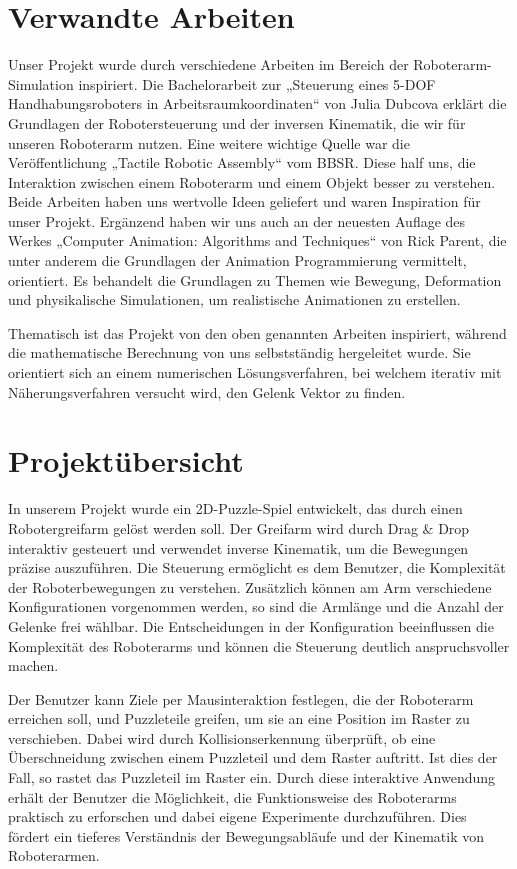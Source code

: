 \documentclass[12pt]{article}
\begin{document}
    \section{Verwandte Arbeiten}
    Unser Projekt wurde durch verschiedene Arbeiten im Bereich der Roboterarm-Simulation inspiriert. Die Bachelorarbeit
    zur „Steuerung eines 5-DOF Handhabungsroboters in Arbeitsraumkoordinaten“\cite{Far01} von Julia Dubcova erklärt die
    Grundlagen der Robotersteuerung und der inversen Kinematik, die wir für unseren Roboterarm nutzen. Eine weitere
    wichtige Quelle war die Veröffentlichung „Tactile Robotic Assembly“\cite{Far02} vom BBSR. Diese half uns, die
    Interaktion zwischen einem Roboterarm und einem Objekt besser zu verstehen. Beide Arbeiten haben uns wertvolle
    Ideen geliefert und waren Inspiration für unser Projekt. Ergänzend haben wir uns auch an der neuesten Auflage des
    Werkes „Computer Animation: Algorithms and Techniques“\cite{Far03} von Rick Parent, die unter anderem die
    Grundlagen der Animation Programmierung vermittelt, orientiert. Es behandelt die Grundlagen zu Themen wie Bewegung,
    Deformation und physikalische Simulationen, um realistische Animationen zu erstellen.

    Thematisch ist das Projekt von den oben genannten Arbeiten inspiriert, während die mathematische Berechnung
    von uns selbstständig hergeleitet wurde. Sie orientiert sich an einem numerischen Lösungsverfahren, bei welchem
    iterativ mit Näherungsverfahren versucht wird, den Gelenk Vektor zu finden.


    \section{Projektübersicht}
    In unserem Projekt wurde ein 2D-Puzzle-Spiel entwickelt, das durch einen Robotergreifarm gelöst werden soll.
    Der Greifarm wird durch Drag & Drop interaktiv gesteuert und verwendet inverse Kinematik, um die Bewegungen
    präzise auszuführen. Die Steuerung ermöglicht es dem Benutzer, die Komplexität der Roboterbewegungen zu verstehen.
    Zusätzlich können am Arm verschiedene Konfigurationen vorgenommen werden, so sind die Armlänge und die Anzahl der
    Gelenke frei wählbar. Die Entscheidungen in der Konfiguration beeinflussen die Komplexität des Roboterarms und
    können die Steuerung deutlich anspruchsvoller machen.

    Der Benutzer kann Ziele per Mausinteraktion festlegen, die der Roboterarm erreichen soll, und Puzzleteile greifen,
    um sie an eine Position im Raster zu verschieben. Dabei wird durch Kollisionserkennung überprüft, ob eine
    Überschneidung zwischen einem Puzzleteil und dem Raster auftritt. Ist dies der Fall, so rastet das Puzzleteil im
    Raster ein. Durch diese interaktive Anwendung erhält der Benutzer die Möglichkeit, die Funktionsweise des
    Roboterarms praktisch zu erforschen und dabei eigene Experimente durchzuführen. Dies fördert ein tieferes
    Verständnis der Bewegungsabläufe und der Kinematik von Roboterarmen.
\end{document}
